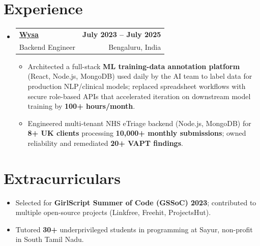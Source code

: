 \documentclass[letterpaper,10pt]{article}
\makeatletter
\newcommand{\resumeItem}[1]{
  \item\small{#1\vspace{-1pt}}
}
\newcommand{\resumeSubheading}[4]{
  \vspace{1pt}\item
    \begin{tabular*}{0.985\textwidth}[t]{l@{\extracolsep{\fill}}r}
      \textbf{#1} & \textbf{\small #2} \\
      {\small\color{ResumeSlate} #3} & {\small\color{ResumeSlate} #4} \\
    \end{tabular*}\vspace{-6pt}
}
\newcommand{\resumeSubHeadingListStart}{\begin{itemize}[leftmargin=0.0in, label={}, itemsep=2pt, topsep=2pt]}
\newcommand{\resumeSubHeadingListEnd}{\end{itemize}}
\newcommand{\resumeItemListStart}{\begin{itemize}[leftmargin=0.18in, itemsep=2pt, topsep=1pt]}
\newcommand{\resumeItemListEnd}{\end{itemize}\vspace{-4pt}}
\makeatother
\begin{document}
\section{Experience}
\resumeSubHeadingListStart
  \resumeSubheading
    {\href{https://www.wysa.io}{Wysa}}{July 2023 -- July 2025}
    {Backend Engineer}{Bengaluru, India}
    \resumeItemListStart
      \resumeItem{Architected a full-stack \textbf{ML training-data annotation platform} (React, Node.js, MongoDB) used daily by the AI team to label data for production NLP/clinical models; replaced spreadsheet workflows with secure role-based APIs that accelerated iteration on downstream model training by \textbf{100+ hours/month}.}
      \resumeItem{Engineered multi-tenant NHS eTriage backend (Node.js, MongoDB) for \textbf{8+ UK clients} processing \textbf{10{,}000+ monthly submissions}; owned reliability and remediated \textbf{20+ VAPT findings}.}
    \resumeItemListEnd
\resumeSubHeadingListEnd
\vspace{-4pt}
\section{Extracurriculars}
\begin{itemize}[leftmargin=0.18in, itemsep=0pt, topsep=1pt]
  \item\small Selected for \textbf{GirlScript Summer of Code (GSSoC) 2023}; contributed to multiple open-source projects (Linkfree, Freehit, ProjectsHut).
  \item\small Tutored \textbf{30+} underprivileged students in programming at Sayur, non-profit in South Tamil Nadu.
\end{itemize}
\vspace{-6pt}
\end{document}
